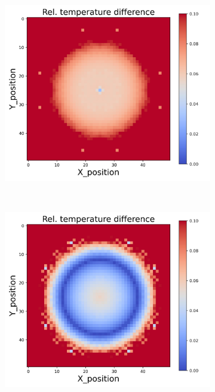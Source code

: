 {\begin{figure}[h]
\begin{minipage}{\textwidth}
\begin{subfigure}{0.27\textwidth}
        \end{subfigure}
        \begin{subfigure}{0.27\textwidth}
            \centering
            \includegraphics[width=\textwidth]{figures/raw_data/21/mix/T_bias.jpg}
        \end{subfigure}
    \end{minipage}\\
    \begin{minipage}{\textwidth}
        \centering
        \begin{subfigure}{0.27\textwidth}
            \centering
            \includegraphics[width=\textwidth]{figures/raw_data/22/mix/T_bias.jpg}

\end{subfigure}
\end{minipage}
\end{figure}}
